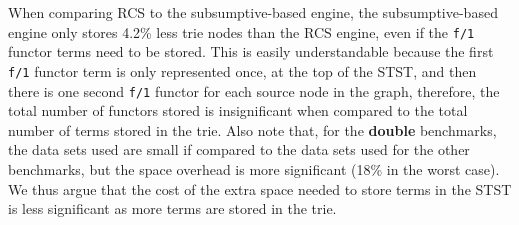 When comparing RCS to the subsumptive-based engine, the subsumptive-based engine only stores 4.2\% less trie nodes
than the RCS engine, even if the \texttt{f/1} functor terms need to be stored. This is easily understandable because
the first \texttt{f/1} functor term is only represented once, at the top of the STST, and then there is one
second \texttt{f/1} functor
for each source node in the graph, therefore, the total number of functors stored is insignificant when
compared to the total number of terms stored in the trie. Also note that, for the \textbf{double} benchmarks,
the data sets used are small if compared to the data sets used for the other benchmarks, but the space overhead
is more significant (18\% in the worst case). We thus argue that the cost of
the extra space needed to store terms in the STST is less significant as more terms are stored in the trie.
